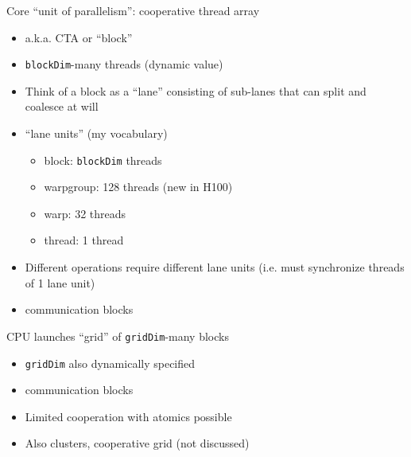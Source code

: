 \begin{minipage}[t]{0.5\textwidth}\fixminipage

Core ``unit of parallelism'': cooperative thread array
\begin{itemize}
  \item a.k.a. CTA or ``block''
  \item \texttt{blockDim}-many threads (dynamic value)
  \item Think of a block as a ``lane'' consisting of sub-lanes that can split and coalesce at will
  \item ``lane units'' (my vocabulary)
  \begin{itemize}
      \item block: \texttt{blockDim} threads
      \item warpgroup: 128 threads (new in H100)
      \item warp: 32 threads
      \item thread: 1 thread
  \end{itemize}
  \item Different operations require different lane units (i.e. must synchronize threads of 1 lane unit)
  \item {} communication  blocks
\end{itemize}

CPU launches ``grid'' of \texttt{gridDim}-many blocks
\begin{itemize}
  \item \texttt{gridDim} also dynamically specified
  \item {} communication  blocks
  \item Limited cooperation with atomics possible
  \item Also clusters, cooperative grid (not discussed)
\end{itemize}
\end{minipage}
\hfill
